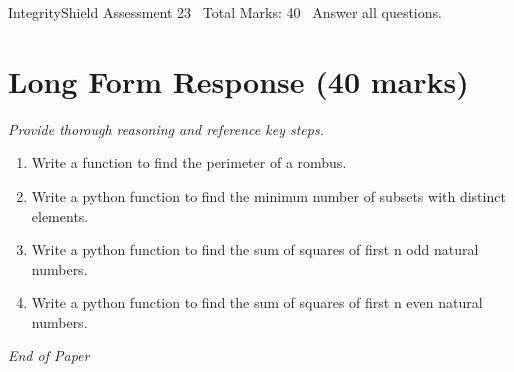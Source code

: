 \documentclass[12pt]{article}
\begin{document}
\begin{center}
IntegrityShield Assessment 23 \
Total Marks: 40 \
Answer all questions.
\end{center}

\section*{Long Form Response (40 marks)}
\textit{Provide thorough reasoning and reference key steps.}
\begin{enumerate}[label=\arabic*.]
\item Write a function to find the perimeter of a rombus.
\item Write a python function to find the minimun number of subsets with distinct elements.
\item Write a python function to find the sum of squares of first n odd natural numbers.
\item Write a python function to find the sum of squares of first n even natural numbers.
\end{enumerate}

\vfill
\noindent\textit{End of Paper}
\end{document}
